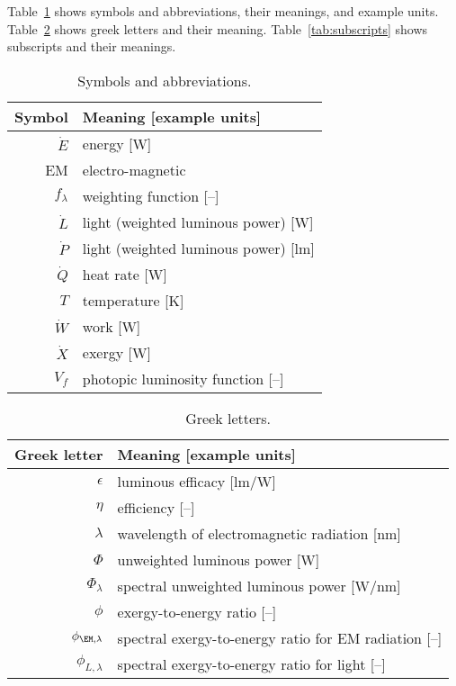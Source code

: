 
\noindent 
Table~\ref{tab:symbols} shows symbols and abbreviations, their meanings, and example units.
Table~\ref{tab:greek} shows greek letters and their meaning.
Table~\ref{tab:subscripts} shows subscripts and their meanings.


  
\begin{table}
\centering %
\caption{Symbols and abbreviations.}
\begin{tabular}{r l}
\toprule
Symbol & Meaning [example units] \\
\midrule
$\dot{E}$ & energy [W] \\
EM & electro-magnetic \\
$f_\lambda$ & weighting function [--] \\
$\dot{L}$ & light (weighted luminous power) [W] \\
$\dot{P}$ & light (weighted luminous power) [lm] \\
$\dot{Q}$ & heat rate [W] \\
$T$ & temperature [K] \\
$\dot{W}$ & work [W] \\
$\dot{X}$ & exergy [W] \\
$V_f$ & photopic luminosity function [--] \\
\bottomrule
\end{tabular}
\label{tab:symbols}
\end{table}



\begin{table}
\centering %
\caption{Greek letters.}
\begin{tabular}{r l}
  \toprule
  Greek letter & Meaning [example units] \\
  \midrule
  $\epsilon$ & luminous efficacy [lm/W] \\
  $\eta$ & efficiency [--] \\
  $\lambda$ & wavelength of electromagnetic radiation [nm] \\
  $\Phi$ & unweighted luminous power [W] \\
  $\Phi_\lambda$ & spectral unweighted luminous power [W/nm] \\
  $\phi$ & exergy-to-energy ratio [--] \\
  $\phi_{\EM,\lambda}$ & spectral exergy-to-energy ratio for EM radiation [--] \\
  $\phi_{L,\lambda}$ & spectral exergy-to-energy ratio for light [--] \\
  \bottomrule
\end{tabular}
\label{tab:greek}
\end{table}


